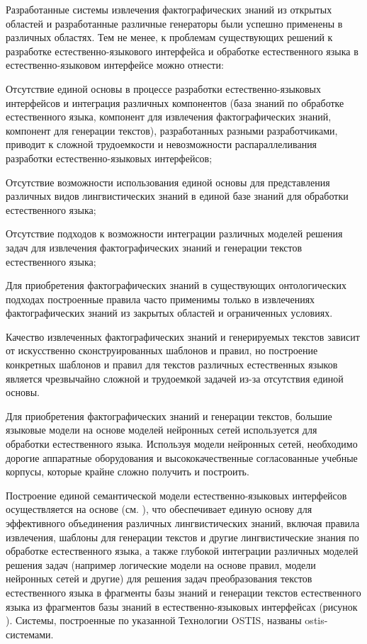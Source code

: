 Разработанные системы извлечения фактографических знаний из открытых областей и разработанные различные генераторы были успешно применены в различных областях. Тем не менее, к проблемам существующих решений к разработке естественно-языкового интерфейса и обработке естественного языка в естественно-языковом интерфейсе можно отнести:
\begin{textitemize}
	\item Отсутствие единой основы в процессе разработки естественно-языковых интерфейсов и интеграция различных компонентов (база знаний по обработке естественного языка, компонент для извлечения фактографических знаний, компонент для генерации текстов), разработанных разными разработчиками, приводит к сложной трудоемкости и невозможности распараллеливания разработки естественно-языковых интерфейсов;
	\item Отсутствие возможности использования единой основы для представления различных видов лингвистических знаний в единой базе знаний для обработки естественного языка;
	\item Отсутствие подходов к возможности интеграции различных моделей решения задач для извлечения фактографических знаний и генерации текстов естественного языка;
	\item Для приобретения фактографических знаний в существующих онтологических подходах построенные правила часто применимы только в извлечениях фактографических знаний из закрытых областей и ограниченных условиях.
	\item Качество извлеченных фактографических знаний и генерируемых текстов зависит от искусственно сконструированных шаблонов и правил, но построение конкретных шаблонов и правил для текстов различных естественных языков является чрезвычайно сложной и трудоемкой задачей из-за отсутствия единой основы.
	\item Для приобретения фактографических знаний и генерации текстов, большие языковые модели на основе моделей нейронных сетей используется для обработки естественного языка. Используя модели нейронных сетей, необходимо дорогие аппаратные оборудования и высококачественные согласованные учебные корпусы, которые  крайне сложно получить и построить.
\end{textitemize}

Построение единой семантической модели естественно-языковых интерфейсов осуществляется на основе  (см. ), что обеспечивает единую основу для эффективного объединения различных лингвистических знаний, включая правила извлечения, шаблоны для генерации текстов и другие лингвистические знания по обработке естественного языка, а также глубокой интеграции различных моделей решения задач (например логические модели на основе правил, модели нейронных сетей и другие) для решения задач преобразования текстов естественного языка в фрагменты базы знаний и генерации текстов естественного языка из фрагментов базы знаний в естественно-языковых интерфейсах (рисунок \textit{}). Системы, построенные по указанной Технологии OSTIS, названы ostis-системами.


